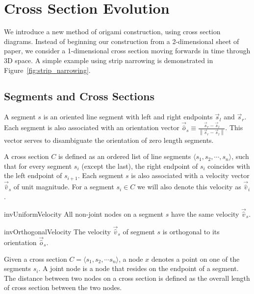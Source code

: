 \section{Cross Section Evolution}
\label{sec:cross_sections}

We introduce a new method of origami construction, using cross section diagrams.
Instead of beginning our construction from a 2-dimensional sheet of paper, we
consider a 1-dimensional cross section moving forwards in time through 3D space.
A simple example using strip narrowing\cite{strip_narrowing} is demonstrated in
Figure~\ref{fig:strip_narrowing}.

\subsection{Segments and Cross Sections}
\label{sec:segments_and_cross_sections}

\begin{definition}
\label{def:segment}
A segment $s$ is an oriented line segment with left and right endpoints $\vec s_l$ and $\vec s_r$.
Each segment is also associated with an orientation vector $\vec{\hat o}_s \equiv\frac{\vec s_r-\vec s_l}{ \left\| \vec s_r-\vec s_l\right\|}$.
This vector serves to disambiguate the orientation of zero length segments.
\end{definition}

\begin{definition}
\label{def:cross_section}
A cross section $C$ is defined as an ordered list of line segments $\langle s_1,s_2,\cdots,s_n\rangle$,
such that for every segment $s_i$ (except the last),
the right endpoint of $s_i$ coincides with the left endpoint of $s_{i+1}$.
Each segment $s$ is also associated with a velocity vector $\vec{\hat v}_s$ of unit magnitude.
For a segment $s_i\in C$ we will also denote this velocity as $\vec{\hat v}_i$.
\end{definition}

\vspace{-1pc}
\begin{restatable}{inv}{UniformVelocity}
\label{inv:uniform_velocity}
All non-joint nodes on a segment $s$ have the same velocity $\vec{\hat v}_s$.
\end{restatable}
\vspace{-1pc}

\begin{restatable}{inv}{OrthogonalVelocity}
\label{inv:orthogonal_velocity}
The velocity $\vec{\hat v}_s$ of segment $s$ is orthogonal to its orientation $\vec{\hat o}_s$.
\end{restatable}

\begin{definition}
\label{def:node}
Given a cross section $C = \langle s_1, s_2,\cdots s_n \rangle$, a node $x$ denotes a point on one of the segments $s_i$.
A joint node is a node that resides on the endpoint of a segment.
The distance between two nodes on a cross section is defined as the overall length of cross section between the two nodes.
\end{definition}





%
